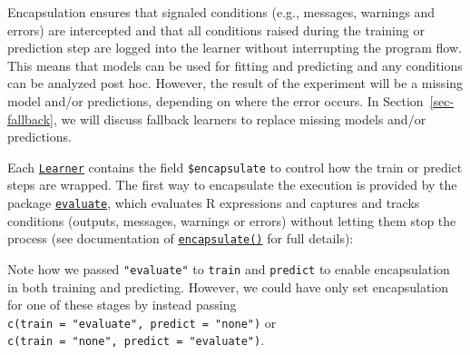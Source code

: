 Encapsulation ensures that signaled conditions (e.g., messages, warnings
and errors) are intercepted and that all conditions raised during the
training or prediction step are logged into the learner without
interrupting the program flow. This means that models can be used for
fitting and predicting and any conditions can be analyzed post hoc.
However, the result of the experiment will be a missing model and/or
predictions, depending on where the error occurs. In
Section~\ref{sec-fallback}, we will discuss fallback learners to replace
missing models and/or predictions.

Each
\href{https://mlr3.mlr-org.com/reference/Learner.html}{\texttt{Learner}}
contains the field
\texttt{\$encapsulate}
to control how the train or predict steps are wrapped. The first way to
encapsulate the execution is provided by the package
\href{https://cran.r-project.org/package=evaluate}{\texttt{evaluate}},
which evaluates R expressions and captures and tracks conditions
(outputs, messages, warnings or errors) without letting them stop the
process (see documentation of
\href{https://mlr3misc.mlr-org.com/reference/encapsulate.html}{\texttt{encapsulate()}}
for full details):

\begin{Shaded}
\begin{Highlighting}[]
\OtherTok{=} \NormalTok{(}\NormalTok{, } \NormalTok{, } \NormalTok{)}

\SpecialCharTok{$}\OtherTok{=} \NormalTok{(} \NormalTok{, } \NormalTok{)}
\SpecialCharTok{$}
\end{Highlighting}
\end{Shaded}

Note how we passed \texttt{"evaluate"} to \texttt{train} and
\texttt{predict} to enable encapsulation in both training and
predicting. However, we could have only set encapsulation for one of
these stages by instead passing
\texttt{c(train\ =\ "evaluate",\ predict\ =\ "none")} or
\texttt{c(train\ =\ "none",\ predict\ =\ "evaluate")}.

